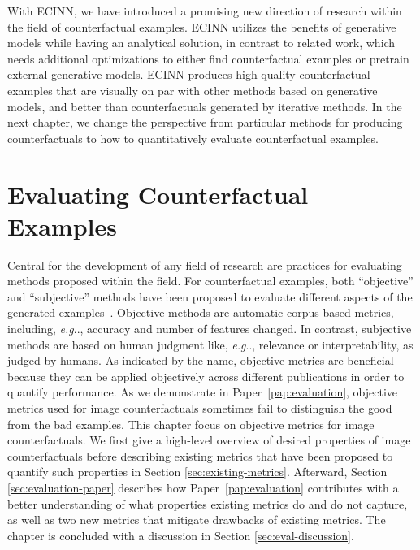 \documentclass[11pt,a4paper,twoside,openright,final]{memoir}
\makeatletter
\DeclareRobustCommand\onedot{\futurelet\@let@token\@onedot}
\def\@onedot{\ifx\@let@token.\else.\null\fi\xspace}
\def\eg{\emph{e.g}\onedot} \def\Eg{\emph{E.g}\onedot}
\newcommand*{\paperref}[1]{Paper~\hyperref[#1]{\ref{#1}}}
\makeatother
\begin{document}
With ECINN, we have introduced a promising new direction of research within the field of counterfactual examples. 
ECINN utilizes the benefits of generative models while having an analytical solution, in contrast to related work, which needs additional optimizations to either find counterfactual examples or pretrain external generative models.
ECINN produces high-quality counterfactual examples that are visually on par with other methods based on generative models, and better than counterfactuals generated by iterative methods.
In the next chapter, we change the perspective from particular methods for producing counterfactuals to how to quantitatively evaluate counterfactual examples. 


\chapter{Evaluating Counterfactual Examples}\label{chap:evaluation}
Central for the development of any field of research are practices for evaluating methods proposed within the field.
For counterfactual examples, both ``objective'' and ``subjective'' methods have been proposed to evaluate different aspects of the generated examples~\cite{Stepin2021}.
Objective methods are automatic corpus-based metrics, including, \eg, accuracy and number of features changed.
In contrast, subjective methods are based on human judgment like, \eg, relevance or interpretability, as judged by humans.
As indicated by the name, objective metrics are beneficial because they can be applied objectively across different publications in order to quantify performance.
As we demonstrate in \paperref{pap:evaluation}, objective metrics used for image counterfactuals sometimes fail to distinguish the good from the bad examples.
This chapter focus on objective metrics for image counterfactuals. 
We first give a high-level overview of desired properties of image counterfactuals before describing existing metrics that have been proposed to quantify such properties in Section \ref{sec:existing-metrics}.
Afterward, Section \ref{sec:evaluation-paper} describes how \paperref{pap:evaluation} contributes with a better understanding of what properties existing metrics do and do not capture, as well as two new metrics that mitigate drawbacks of existing metrics.
The chapter is concluded with a discussion in Section \ref{sec:eval-discussion}.
\end{document}
